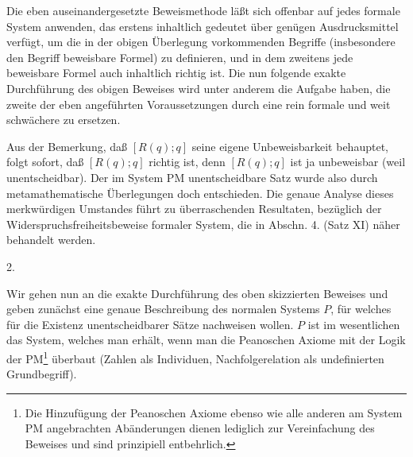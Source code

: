 \documentclass[draft]{scrartcl}
\newcounter{commentaryNumber}
\begin{document}
Die eben auseinandergesetzte Beweismethode läßt sich
offenbar auf jedes formale System anwenden, das erstens
inhaltlich gedeutet über genügen Ausdrucksmittel
verfügt, um die in der obigen Überlegung vorkommenden
Begriffe (insbesondere den Begriff \glqq beweisbare
Formel\grqq) zu definieren, und in dem zweitens jede
beweisbare Formel auch inhaltlich richtig ist. Die
nun folgende exakte Durchführung des obigen Beweises
wird unter anderem die Aufgabe haben, die zweite der eben
angeführten Voraussetzungen durch eine rein formale und
weit schwächere zu ersetzen.

Aus der Bemerkung, daß $\left[R\left(q\right); q\right]$ seine
eigene
Unbeweisbarkeit behauptet, folgt sofort, daß $\left[R\left(q\right); q\right]$
richtig ist, denn $\left[R\left(q\right); q\right]$ ist ja unbeweisbar (weil
unentscheidbar). Der im System PM unentscheidbare Satz
wurde also durch metamathematische Überlegungen doch
entschieden. Die genaue Analyse dieses merkwürdigen
Umstandes führt zu überraschenden Resultaten, bezüglich der
Widerspruchsfreiheitsbeweise formaler System, die in
Abschn. 4. (Satz XI) näher behandelt werden.

\begin{center}
2.
\end{center}

Wir gehen nun an die exakte Durchführung des
oben skizzierten Beweises und geben zunächst eine
genaue Beschreibung des normalen Systems $P$, für welches
für die Existenz unentscheidbarer Sätze nachweisen wollen.
$P$ ist im wesentlichen das System, welches man erhält,
wenn man die Peanoschen Axiome mit der Logik
der PM\footnote{Die Hinzufügung der Peanoschen
Axiome ebenso wie alle anderen am System PM angebrachten
Abänderungen dienen lediglich zur Vereinfachung des
Beweises und sind prinzipiell entbehrlich.}
überbaut (Zahlen als Individuen, Nachfolgerelation
als undefinierten Grundbegriff).
\end{document}
